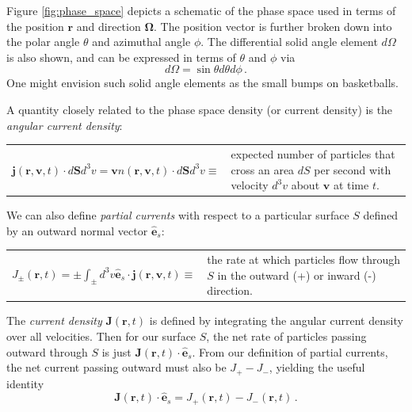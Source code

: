 Figure \ref{fig:phase_space} depicts a schematic of the phase space used in terms of the position $\mathbf{r}$ and direction $\mathbf{\Omega}$.  The position vector is further broken down into the polar angle $\theta$ and azimuthal angle $\phi$.  The differential solid angle element $d\Omega$ is also shown, and can be expressed in terms of $\theta$ and $\phi$ via
\begin{equation*}
 d\Omega = \sin{\theta} d\theta d\phi \, .
\end{equation*}  
One might envision such solid angle elements as the small bumps on basketballs.  

A quantity closely related to the phase space density (or current density) is the \textit{angular current density}:
\begin{center}
  \begin{tabular}{cp{5.0cm}}
    $\mathbf{j}(\mathbf{r},\mathbf{v},t)\cdot d\mathbf{S} d^3v = \mathbf{v} n(\mathbf{r},\mathbf{v},t) \cdot d\mathbf{S} d^3v \equiv $ &
    expected number of particles that cross an area $dS$ per second with velocity $d^3v$ about $\mathbf{v}$ at time $t$.
  \end{tabular}
\end{center}

We can also define \textit{partial currents} with respect to a particular surface $S$ defined by an outward normal vector $\mathbf{\hat{e}}_s$:

\begin{center}
  \begin{tabular}{cp{5.0cm}}
    $J_{\pm}(\mathbf{r},t) = \pm \int_{\pm} d^3v  \mathbf{\hat{e}}_s \cdot \mathbf{j} (\mathbf{r},\mathbf{v},t) \equiv $ &
   the rate at which particles flow through $S$ in the outward (+) or inward (-) direction.
  \end{tabular}
\end{center}

The \textit{current density} $\mathbf{J}(\mathbf{r},t)$ is defined by integrating the angular current density over all velocities.  Then for our surface $S$, the net rate of particles passing outward through $S$ is just $\mathbf{J}(\mathbf{r},t) \cdot \mathbf{\hat{e}}_s$.  From our definition of partial currents, the net current passing outward must also be $J_+ - J_-$, yielding the useful identity
\begin{equation}
 \mathbf{J}(\mathbf{r},t) \cdot \mathbf{\hat{e}}_s = J_{+}(\mathbf{r},t) - J_{-}(\mathbf{r},t) \, .
 \label{eq:net2partial}
\end{equation}

